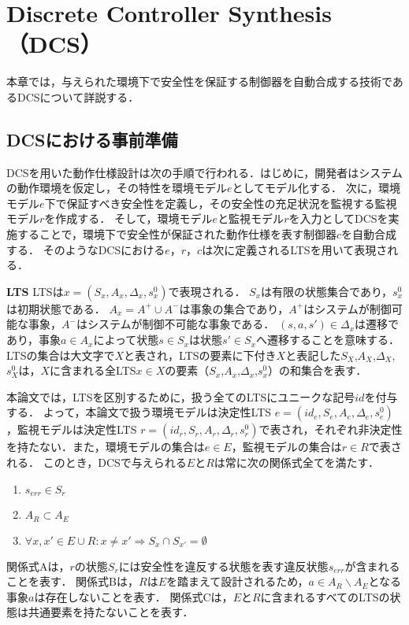 \section{Discrete Controller Synthesis（DCS）}
\label{section:DCS}
本章では，与えられた環境下で安全性を保証する制御器を自動合成する技術であるDCSについて詳説する．

\subsection{DCSにおける事前準備}
\label{subsection:preparation}
DCSを用いた動作仕様設計は次の手順で行われる．はじめに，開発者はシステムの動作環境を仮定し，その特性を環境モデル$e$としてモデル化する．
次に，環境モデル$e$下で保証すべき安全性を定義し，その安全性の充足状況を監視する監視モデル$r$を作成する．
そして，環境モデル$e$と監視モデル$r$を入力としてDCSを実施することで，環境下で安全性が保証された動作仕様を表す制御器$c$を自動合成する．
そのようなDCSにおける$e$，$r$，$c$は次に定義されるLTSを用いて表現される．

\begin{dfn}{\textbf{LTS}}
\label{def:component_model}
    LTSは$x = (S_{x}, A_{x}, \Delta_{x}, s^0_{x})$で表現される．
    $S_{x}$は有限の状態集合であり，$s^0_{x}$は初期状態である．
    $A_{x} = A^+ \cup A^-$は事象の集合であり，$A^+$はシステムが制御可能な事象，$A^-$はシステムが制御不可能な事象である．
    $(s,a,s') \in \Delta_{x}$は遷移であり，事象$a \in A_{x}$によって状態$s \in S_{x}$は状態$s' \in S_{x}$へ遷移することを意味する．
    LTSの集合は大文字で$X$と表され，LTSの要素に下付き$X$と表記した$S_{X}$,$A_{X}$,$\Delta_{X}$,$s^0_{X}$は，$X$に含まれる全LTS$x \in X$の要素（$S_{x}$,$A_{x}$,$\Delta_{x}$,$s^0_{x}$）の和集合を表す．
\end{dfn}

本論文では，LTSを区別するために，扱う全てのLTSにユニークな記号$id$を付与する．
よって，本論文で扱う環境モデルは決定性LTS $e = (id_{e}, S_{e}, A_{e}, \Delta_{e}, s^0_{e})$，監視モデルは決定性LTS $r = (id_{r}, S_{r}, A_{r}, \Delta_{r}, s^0_{r})$で表され，それぞれ非決定性を持たない．また，環境モデルの集合は$e \in E$，監視モデルの集合は$r \in R$で表される．
このとき，DCSで与えられる$E$と$R$は常に次の関係式全てを満たす．
\begin{enumerate}[\bf 関係式A]
\item $s_{err} \in S_{r}$
\item $A_{R} \subset A_{E}$
\item $\forall x, x' \in E \cup R:  x \neq x'  \Rightarrow S_x \cap S_{x'} = \emptyset$
\end{enumerate}
関係式Aは，$r$の状態$S_{r}$には安全性を違反する状態を表す違反状態$s_{err}$が含まれることを表す．
関係式Bは，$R$は$E$を踏まえて設計されるため，$a \in A_{R} \backslash A_{E}$となる事象$a$は存在しないことを表す．
関係式Cは，$E$と$R$に含まれるすべてのLTSの状態は共通要素を持たないことを表す．

